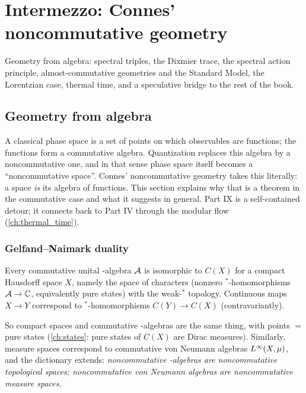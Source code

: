\chapter{Intermezzo: Connes' noncommutative geometry}\label{ch:ncg}

Geometry from algebra: spectral triples, the Dixmier trace, the spectral action principle, almost-commutative geometries and the Standard Model, the Lorentzian case, thermal time, and a speculative bridge to the rest of the book.

\section{Geometry from algebra}\label{ch:gelfand}
\skippable

\begin{physmotiv}
A classical phase space is a set of points on which observables are functions; the functions form a commutative algebra. Quantization replaces this algebra by a noncommutative one, and in that sense phase space itself becomes a ``noncommutative space''. Connes' noncommutative geometry takes this literally: a space \emph{is} its algebra of functions. This section explains why that is a theorem in the commutative case and what it suggests in general. Part IX is a self-contained detour; it connects back to Part IV through the modular flow (\cref{ch:thermal_time}).
\end{physmotiv}

\subsection{Gelfand--Naimark duality}

\begin{theorem}
Every commutative unital \cstar-algebra $\mathcal{A}$ is isomorphic to $C(X)$ for a compact Hausdorff space $X$, namely the space of characters (nonzero $^*$-homomorphisms $\mathcal{A}\to\mathbb{C}$, equivalently pure states) with the weak-$^*$ topology. Continuous maps $X\to Y$ correspond to $^*$-homomorphisms $C(Y)\to C(X)$ (contravariantly).
\end{theorem}

So compact spaces and commutative \cstar-algebras are the same thing, with points $=$ pure states (\cref{ch:states}: pure states of $C(X)$ are Dirac measures). Similarly, measure spaces correspond to commutative von Neumann algebras $L^\infty(X,\mu)$, and the dictionary extends: \emph{noncommutative \cstar-algebras are noncommutative topological spaces; noncommutative von Neumann algebras are noncommutative measure spaces}.

